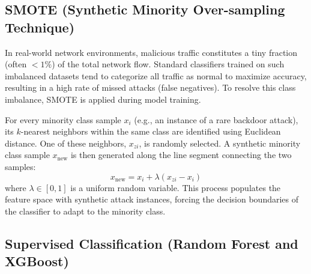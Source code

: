 \documentclass[12pt,a4paper]{report}
\begin{document}
\subsection{SMOTE (Synthetic Minority Over-sampling Technique)}

In real-world network environments, malicious traffic constitutes a tiny fraction (often $< 1\%$) of the total network flow. Standard classifiers trained on such imbalanced datasets tend to categorize all traffic as normal to maximize accuracy, resulting in a high rate of missed attacks (false negatives). To resolve this class imbalance, SMOTE is applied during model training.

For every minority class sample $x_i$ (e.g., an instance of a rare backdoor attack), its $k$-nearest neighbors within the same class are identified using Euclidean distance. One of these neighbors, $x_{zi}$, is randomly selected. A synthetic minority class sample $x_{\text{new}}$ is then generated along the line segment connecting the two samples:
\begin{equation}
  x_{\text{new}} = x_i + \lambda (x_{zi} - x_i)
\end{equation}
where $\lambda \in [0, 1]$ is a uniform random variable. This process populates the feature space with synthetic attack instances, forcing the decision boundaries of the classifier to adapt to the minority class.

\subsection{Supervised Classification (Random Forest and XGBoost)}
\end{document}

